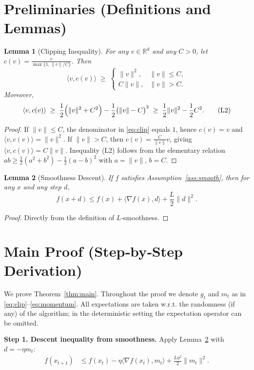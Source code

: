 \documentclass{article}
\newtheorem{lemma}{Lemma}
\newcommand{\clip}[2]{\frac{#1}{\max\{1,\|#1\|/#2\}}}
\newcommand{\R}{\mathbb{R}}
\begin{document}
\newpage
\section*{Preliminaries (Definitions and Lemmas)}
\begin{lemma}[Clipping Inequality]\label{lem:clip}
For any $v\in\R^{d}$ and any $C>0$, let $c(v)=\clip{v}{C}$. Then
\[
    \langle v, c(v)\rangle \;\ge\;
    \begin{cases}
        \|v\|^{2}, & \|v\|\le C,\\[2pt]
        C\|v\|,   & \|v\|> C .
    \end{cases}
\tag{L1}
\]
Moreover,
\[
    \langle v, c(v)\rangle \;\ge\; \frac12\Bigl(\|v\|^{2}+C^{2}\Bigr)-\frac12\bigl(\|v\|-C\bigr)^{2}
    \;\ge\; \frac12\|v\|^{2}-\frac12 C^{2}.
\tag{L2}
\]
\end{lemma}
\begin{proof}
If $\|v\|\le C$, the denominator in \eqref{eq:clip} equals $1$, hence
$c(v)=v$ and $\langle v,c(v)\rangle=\|v\|^{2}$.  
If $\|v\|>C$, then $c(v)=\frac{C}{\|v\|}v$, giving
$\langle v,c(v)\rangle = C\|v\|$.  Inequality (L2) follows from the elementary
relation $ab\ge \frac12(a^{2}+b^{2})-\frac12(a-b)^{2}$ with $a=\|v\|$, $b=C$.
\end{proof}

\begin{lemma}[Smoothness Descent]\label{lem:smooth}
If $f$ satisfies Assumption~\ref{ass:smooth}, then for any $x$ and any step
$d$,
\[
    f(x+d)\le f(x)+\langle\nabla f(x),d\rangle+\frac{L}{2}\|d\|^{2}.
\tag{L3}
\]
\end{lemma}
\begin{proof}
Directly from the definition of $L$‑smoothness.
\end{proof}

\section*{Main Proof (Step‑by‑Step Derivation)}
We prove Theorem~\ref{thm:main}. Throughout the proof we denote
$g_t$ and $m_t$ as in \eqref{eq:clip}–\eqref{eq:momentum}.
All expectations are taken w.r.t. the randomness (if any) of the algorithm;
in the deterministic setting the expectation operator can be omitted.

\bigskip
\noindent\textbf{Step 1. Descent inequality from smoothness.}  
Apply Lemma~\ref{lem:smooth} with $d=-\eta m_t$:
\[
\begin{aligned}
    f(x_{t+1})
    &\le f(x_t)-\eta\langle\nabla f(x_t),m_t\rangle
          +\frac{L\eta^{2}}{2}\|m_t\|^{2}.
\tag{1}
\end{aligned}
\]
\end{document}

